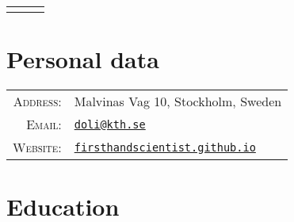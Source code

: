 \documentclass[a4paper,10pt]{article}
\begin{document}
\pagestyle{empty}


\begin{center}
  \begin{tabular}{lcr}
    \par{\centering{\Huge Dong Liu}\bigskip\par} & & %
  \end{tabular}
\end{center}

\section{Personal data}

\begin{tabular}{rl}
  \textsc{Address:} & Malvinas Vag 10, Stockholm, Sweden \\
  \textsc{Email:} & \href{mailto:doli@kth.se}{\nolinkurl{doli@kth.se}} \\
  \textsc{Website:} & \href{https://firsthandscientist.github.io}{\nolinkurl{firsthandscientist.github.io}}
\end{tabular}


\section{Education}
\end{document}
